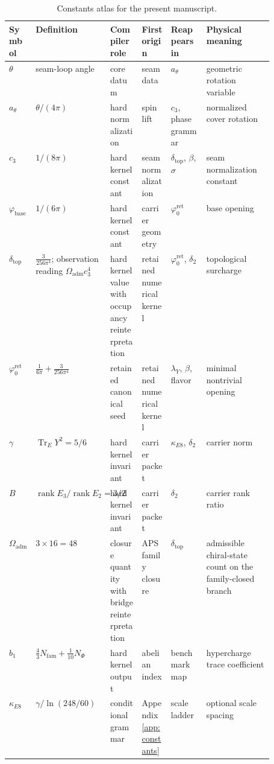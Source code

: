 \documentclass[11pt,a4paper]{article}
\theoremstyle{definition}
\theoremstyle{remark}
\DeclareMathOperator{\tr}{Tr}
\DeclareMathOperator{\rank}{rank}
\newcommand{\cthree}{c_3}
\newcommand{\atheta}{a_\theta}
\newcommand{\phibase}{\varphi_{\mathrm{base}}}
\newcommand{\phiz}{\varphi_0^{\mathrm{ret}}}
\newcommand{\deltatop}{\delta_{\mathrm{top}}}
\newcommand{\bone}{b_1}
\newcommand{\Oadm}{\Omega_{\mathrm{adm}}}
\newcommand{\lambdaY}{\lambda_Y}
\begin{document}
\begin{table}[t]
\centering
\scriptsize
\setlength{\tabcolsep}{3pt}
\begin{tabularx}{\linewidth}{@{}>{\raggedright\arraybackslash}p{0.10\linewidth}>{\raggedright\arraybackslash}p{0.18\linewidth}>{\raggedright\arraybackslash}p{0.12\linewidth}>{\raggedright\arraybackslash}p{0.11\linewidth}YY@{}}
\toprule
Symbol & Definition & Compiler role & First origin & Reappears in & Physical meaning \\
\midrule
$\theta$ & seam-loop angle & core datum & seam data & $\atheta$ & geometric rotation variable \\
$\atheta$ & $\theta/(4\pi)$ & hard normalization & spin lift & $\cthree$, phase grammar & normalized cover rotation \\
$\cthree$ & $1/(8\pi)$ & hard kernel constant & seam normalization & $\deltatop$, $\beta$, $\sigma$ & seam normalization constant \\
$\phibase$ & $1/(6\pi)$ & hard kernel constant & carrier geometry & $\phiz$ & base opening \\
$\deltatop$ & $\frac{3}{256\pi^4}$; observation reading $\Oadm\cthree^4$ & hard kernel value with occupancy reinterpretation & retained numerical kernel & $\phiz$, $\delta_2$ & topological surcharge \\
$\phiz$ & $\frac{1}{6\pi}+\frac{3}{256\pi^4}$ & retained canonical seed & retained numerical kernel & $\lambdaY$, $\beta$, flavor & minimal nontrivial opening \\
$\gamma$ & $\tr_EY^2=5/6$ & hard kernel invariant & carrier packet & $\kappa_{E8}$, $\delta_2$ & carrier norm \\
$B$ & $\rank E_3/\rank E_2=3/2$ & hard kernel invariant & carrier packet & $\delta_2$ & carrier rank ratio \\
$\Oadm$ & $3\times16=48$ & closure quantity with bridge reinterpretation & APS family closure & $\deltatop$ & admissible chiral-state count on the family-closed branch \\
$\bone$ & $\frac43N_{\mathrm{fam}}+\frac1{10}N_\Phi$ & hard kernel output & abelian index & benchmark map & hypercharge trace coefficient \\
$\kappa_{E8}$ & $\gamma/\ln(248/60)$ & conditional grammar & Appendix~\ref{app:constants} & scale ladder & optional scale spacing \\
\bottomrule
\end{tabularx}
\caption{Constants atlas for the present manuscript.}
\label{tab:constants-atlas}
\end{table}
\end{document}
